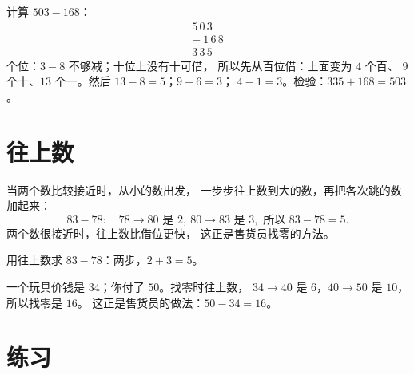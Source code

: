 \begin{example}\label{ex:g2:subtraction:worked}
计算 $503 - 168$：
\[
\begin{array}{r}
5\,0\,3 \\
-\ 1\,6\,8 \\
\hline
3\,3\,5
\end{array}
\]
个位：$3 - 8$ 不够减；十位上没有十可借，
所以先从百位借：上面变为 $4$ 个百、
$9$ 个十、$13$ 个一。然后 $13 - 8 = 5$；$9 - 6 = 3$；
$4 - 1 = 3$。检验：$335 + 168 = 503$。\checkmark
\end{example}

\section{往上数}

\begin{method}[用往上数的方法减]\label{met:g2:subtraction:countup}
当两个数比较接近时，从小的数出发，
一步步往上数到大的数，再把各次跳的数加起来：
\[
83 - 78: \quad 78 \to 80 \text{ 是 } 2, \ 80 \to 83 \text{ 是 } 3,
\text{ 所以 } 83 - 78 = 5 .
\]
两个数很接近时，往上数比借位更快，
这正是售货员找零的方法。
\end{method}

\begin{omfigure}

{\small 用往上数求 $83 - 78$：两步，$2 + 3 = 5$。}
\end{omfigure}

\begin{example}[找零]\label{ex:g2:subtraction:change}
一个玩具价钱是 $34$；你付了 $50$。找零时往上数，
$34 \to 40$ 是 $6$，$40 \to 50$ 是 $10$，所以找零是 $16$。
这正是售货员的做法：$50 - 34 = 16$。
\end{example}

\section{练习}

